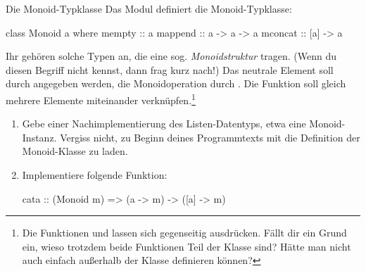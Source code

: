 \documentclass{uebblatt}
\begin{document}
\begin{aufgabe}{Die Monoid-Typklasse}
Das Modul  definiert die Monoid-Typklasse:
\begin{haskellcode}
class Monoid a where
    mempty  :: a
    mappend :: a -> a -> a
    mconcat :: [a] -> a
\end{haskellcode}
Ihr gehören solche Typen an, die eine sog. \emph{Monoidstruktur} tragen. (Wenn
du diesen Begriff nicht kennst, dann frag kurz nach!) Das neutrale Element soll
durch  angegeben werden, die Monoidoperation durch
. Die Funktion  soll gleich
mehrere Elemente miteinander verknüpfen.\footnote{Die Funktionen
 und  lassen sich gegenseitig
ausdrücken. Fällt dir ein Grund ein, wieso trotzdem beide Funktionen Teil der
Klasse sind? Hätte man nicht auch einfach  außerhalb der
Klasse definieren können?}

\begin{enumerate}
\item Gebe einer Nachimplementierung des Listen-Datentyps, etwa
 eine Monoid-Instanz.
Vergiss nicht, zu Beginn deines Programmtexts mit  die Definition der Monoid-Klasse zu laden.
\item Implementiere folgende Funktion:
\begin{haskellcode}
cata :: (Monoid m) => (a -> m) -> ([a] -> m)
\end{haskellcode}
\end{enumerate}
\end{aufgabe}
\end{document}
